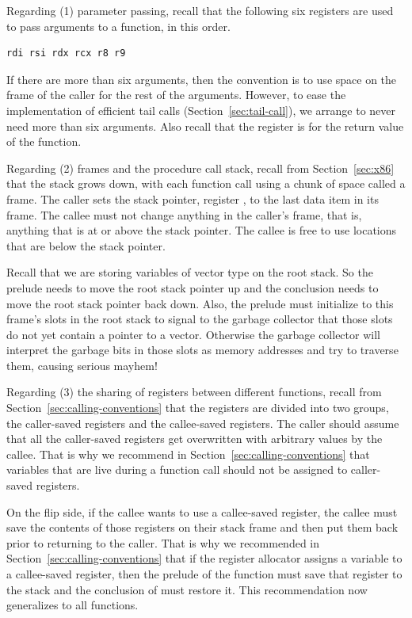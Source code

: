 \documentclass[11pt]{book}
\begin{document}
Regarding (1) parameter passing, recall that the following six
registers are used to pass arguments to a function, in this order.
\begin{lstlisting}
rdi rsi rdx rcx r8 r9
\end{lstlisting}
If there are
more than six arguments, then the convention is to use space on the
frame of the caller for the rest of the arguments. However, to ease
the implementation of efficient tail calls
(Section~\ref{sec:tail-call}), we arrange to never need more than six
arguments.
%
Also recall that the register  is for the return value of
the function.


Regarding (2) frames  and the procedure call stack,
 recall from Section~\ref{sec:x86} that
the stack grows down, with each function call using a chunk of space
called a frame. The caller sets the stack pointer, register
, to the last data item in its frame. The callee must not
change anything in the caller's frame, that is, anything that is at or
above the stack pointer. The callee is free to use locations that are
below the stack pointer.

Recall that we are storing variables of vector type on the root stack.
So the prelude needs to move the root stack pointer  up and
the conclusion needs to move the root stack pointer back down.  Also,
the prelude must initialize to  this frame's slots in the root
stack to signal to the garbage collector that those slots do not yet
contain a pointer to a vector. Otherwise the garbage collector will
interpret the garbage bits in those slots as memory addresses and try
to traverse them, causing serious mayhem!

Regarding (3) the sharing of registers between different functions,
recall from Section~\ref{sec:calling-conventions} that the registers
are divided into two groups, the caller-saved registers and the
callee-saved registers. The caller should assume that all the
caller-saved registers get overwritten with arbitrary values by the
callee. That is why we recommend in
Section~\ref{sec:calling-conventions} that variables that are live
during a function call should not be assigned to caller-saved
registers.

On the flip side, if the callee wants to use a callee-saved register,
the callee must save the contents of those registers on their stack
frame and then put them back prior to returning to the caller.  That
is why we recommended in Section~\ref{sec:calling-conventions} that if
the register allocator assigns a variable to a callee-saved register,
then the prelude of the  function must save that register
to the stack and the conclusion of  must restore it.  This
recommendation now generalizes to all functions.
\end{document}
